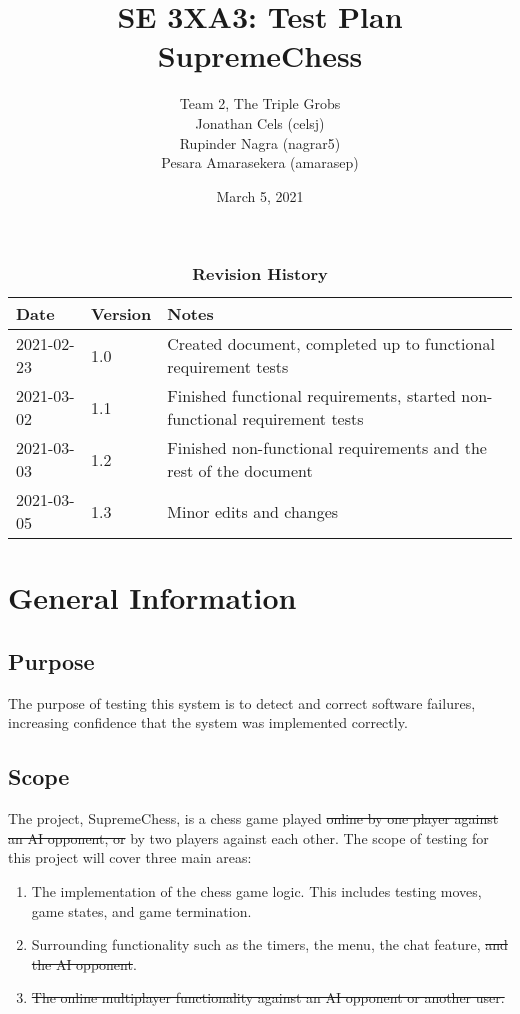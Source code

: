 \documentclass[12pt, titlepage]{article}
\title{SE 3XA3: Test Plan\\SupremeChess}
\author{Team 2, The Triple Grobs
        \\ Jonathan Cels (celsj)
        \\ Rupinder Nagra (nagrar5)
		\\ Pesara Amarasekera (amarasep)
}
\date{March 5, 2021}
\begin{document}
\maketitle

\tableofcontents
\listoftables

\begin{table}[bp]
\caption{\bf Revision History}
\begin{tabularx}{\textwidth}{p{3cm}p{2cm}X}
\toprule {\bf Date} & {\bf Version} & {\bf Notes}\\
\midrule
2021-02-23 & 1.0 & Created document, completed up to functional requirement tests\\
2021-03-02 & 1.1 & Finished functional requirements, started non-functional requirement tests\\
2021-03-03 & 1.2 & Finished non-functional requirements and the rest of the document\\
2021-03-05 & 1.3 & Minor edits and changes\\
\bottomrule
\end{tabularx}
\end{table}

\newpage


\section{General Information}

\subsection{Purpose}

The purpose of testing this system is to detect and correct software failures, increasing confidence that the system was implemented correctly.

\subsection{Scope}

The project, SupremeChess, is a chess game played \sout{online by one player against an AI opponent, or} by two players against each other. The scope of testing for this project will cover three main areas:

\begin{enumerate}
    \item The implementation of the chess game logic. This includes testing moves, game states, and game termination.
    \item Surrounding functionality such as the timers, the menu, the chat feature, \sout{and the AI opponent}.
    \item \sout{The online multiplayer functionality against an AI opponent or another user.}
\end{enumerate}
\end{document}

